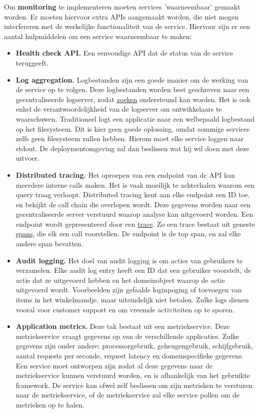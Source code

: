 	Om \textbf{monitoring} te implementeren moeten services 'waarneembaar' gemaakt worden. Er moeten hiervoor extra APIs aangemaakt worden, die niet mogen interfereren met de werkelijke functionaliteit van de service. Hiervoor zijn er een aantal hulpmiddelen om een service waarneembaar te maken:
	\begin{itemize}
		\item \textbf{Health check API.} Een eenvoudige API dat de status van de service teruggeeft.
		\item \textbf{Log aggregation.} Logbestanden zijn een goede manier om de werking van de service op te volgen. Deze logbestanden worden best geschreven naar een gecentraliseerde logserver, zodat \underline{zoeken} ondersteund kan worden. Het is ook enkel de verantwoordelijkheid van de logserver om ontwikkelaars te waarschuwen. Traditioneel logt een applicatie naar een welbepaald logbestand op het filesysteem. Dit is hier geen goede oplossing, omdat sommige services zelfs geen filesysteem zullen hebben. Hierom moet elke service loggen naar stdout. De deploymentomgeving zal dan beslissen wat hij wil doen met deze uitvoer. 
		\item \textbf{Distributed tracing.} Het oproepen van een endpoint van de API kan meerdere interne calls maken. Het is vaak moeilijk te achterhalen waarom een query traag verloopt. Distributed tracing kent aan elke endpoint een ID toe, en bekijkt de call chain die overlopen wordt. Deze gegevens worden naar een gecentraliseerde server verstuurd waarop analyse kan uitgevoerd worden. Een endpoint wordt gepresenteerd door een \underline{trace}. Zo een trace bestaat uit geneste \underline{spans}, die elk een call voorstellen. De endpoint is de top span, en zal elke andere span bevatten. 
		\item \textbf{Audit logging.} Het doel van audit logging is om acties van gebruikers te verzamelen. Elke audit log entry heeft een ID dat een gebruiker voorstelt, de actie dat ze uitgevoerd hebben en het domeinobject waarop de actie uitgevoerd wordt. Voorbeelden zijn gefaalde loginpoging of toevoegen van items in het winkelmandje, maar uiteindelijk niet betalen. Zulke logs dienen vooral voor customer support en om vreemde activiteiten op te sporen.
		\item \textbf{Application metrics.} Deze tak bestaat uit een metriekservice. Deze metriekservice vraagt gegevens op van de verschillende applicaties. Zulke gegevens zijn onder andere: processorgebruik, geheugengebruik, schijfgebruik, aantal requests per seconde, request latency en domeinspecifieke gegevens. Een service moet ontworpen zijn zodat al deze gegevens naar de metriekservice kunnen verstuurd worden, en is afhankelijk van het gebruikte framework. De service kan ofwel zelf beslissen om zijn metrieken te versturen naar de metriekservice, of de metriekservice zal elke service pollen om de metrieken op te halen.
	\end{itemize}
